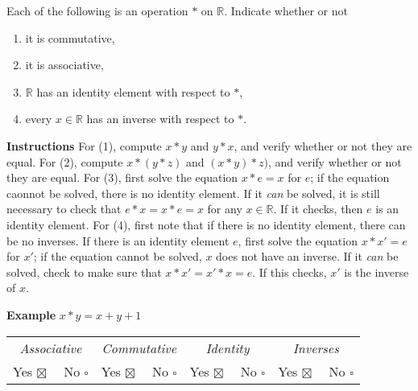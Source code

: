 \documentclass[twoside]{amsart}
\newcommand{\Reals}{\mathbb{R}{}}
\newcommand{\brk}{\vspace{5pt}}
\begin{document}
\brk \noindent Each of the following is an operation $*$ on
$\Reals$. Indicate whether or not

\begin{enumerate}[label=\protect{(\roman*)}]
\item it is commutative,
\item it is associative,
\item $\Reals$ has an identity element with respect to $*$,
\item every $x \in \Reals$ has an inverse with respect to $*$.
\end{enumerate}

\brk \noindent \textbf{Instructions} For (1), compute $x * y$ and $y *
x$, and verify whether or not they are equal. For (2), compute $x * (y
* z)$ and $(x * y) * z)$, and verify whether or not they are
equal. For (3), first solve the equation $x * e = x$ for $e$; if the
equation caonnot be solved, there is no identity element. If it
\emph{can} be solved, it is still necessary to check that $e*x=x*e=x$
for any $x\in \Reals$. If it checks, then $e$ is an identity
element. For (4), first note that if there is no identity element,
there can be no inverses. If there is an identity element $e$, first
solve the equation $x*x'=e$ for $x'$; if the equation cannot be
solved, $x$ does not have an inverse. If it \emph{can} be solved,
check to make sure that $x*x'=x'*x=e$. If this checks, $x'$ is the
inverse of $x$. \brk

\noindent \textbf{Example} $x * y = x + y + 1$ \brk

\begin{tabular}{cccc}
  \emph{Associative} & \emph{Commutative} & \emph{Identity} &
  \emph{Inverses} \\

  Yes $\boxtimes \quad$ No $\square$ & Yes $\boxtimes \quad$ No $\square$ &
  Yes $\boxtimes \quad$ No $\square$ & Yes $\boxtimes \quad$ No $\square$ 

\end{tabular}
\end{document}
